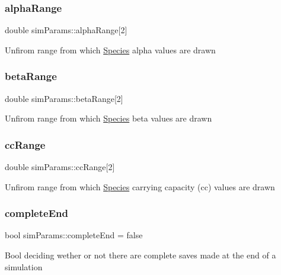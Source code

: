 \subsubsection{\texorpdfstring{alpha\+Range}{alphaRange}}
{\footnotesize\ttfamily double sim\+Params\+::alpha\+Range\mbox{[}2\mbox{]}}

Unfirom range from which \hyperlink{classSpecies}{Species} alpha values are drawn \hypertarget{structsimParams_a676b73cd7d60743090c9f2b4c166c083}{}\label{structsimParams_a676b73cd7d60743090c9f2b4c166c083} 
\subsubsection{\texorpdfstring{beta\+Range}{betaRange}}
{\footnotesize\ttfamily double sim\+Params\+::beta\+Range\mbox{[}2\mbox{]}}

Unfirom range from which \hyperlink{classSpecies}{Species} beta values are drawn \hypertarget{structsimParams_a730247ea2898e90b85dd99c55d8a18e3}{}\label{structsimParams_a730247ea2898e90b85dd99c55d8a18e3} 
\subsubsection{\texorpdfstring{cc\+Range}{ccRange}}
{\footnotesize\ttfamily double sim\+Params\+::cc\+Range\mbox{[}2\mbox{]}}

Unfirom range from which \hyperlink{classSpecies}{Species} carrying capacity (cc) values are drawn \hypertarget{structsimParams_a7b06eae32b1691cb52bfc4a7e135f589}{}\label{structsimParams_a7b06eae32b1691cb52bfc4a7e135f589} 
\subsubsection{\texorpdfstring{complete\+End}{completeEnd}}
{\footnotesize\ttfamily bool sim\+Params\+::complete\+End = false}

Bool deciding wether or not there are complete saves made at the end of a simulation \hypertarget{structsimParams_ad96e572c78fc800e13936b937f3addca}{}\label{structsimParams_ad96e572c78fc800e13936b937f3addca} 
